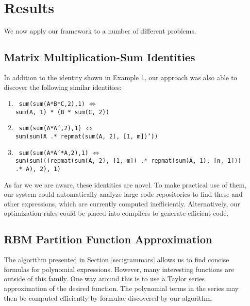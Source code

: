 
\vspace{-2mm}
\section{Results}
\vspace{-2mm}

We now apply our framework to a number of different problems.

\vspace{-2mm}
\subsection{Matrix Multiplication-Sum Identities}
In addition to the identity shown in Example 1, our approach was also
able to discover the following similar identities:
\begin{enumerate}
\item \texttt{ sum(sum(A*B*C,2),1)} $\iff$ \\ \texttt{sum(A, 1) * (B * sum(C, 2))}
\item \texttt{ sum(sum(A*A',2),1)} $\iff$ \\ \hspace{-5mm}  \texttt{sum(sum(A .* repmat(sum(A, 2), [1, m])'))}
\item \texttt{ sum(sum(A*A'*A,2),1)} $\iff$ \\ \texttt{sum(sum(((repmat(sum(A, 2), [1, m]) .* repmat(sum(A, 1), [n, 1])) .* A), 2), 1) 
} 
\end{enumerate}

As far we we are aware, these identities are novel. To make practical
use of them, our
system could automatically analyze large code repositories to find
these and other expressions, which are currently computed
inefficiently. Alternatively, our optimization rules could be placed
into compilers to generate efficient code.

\subsection{RBM Partition Function Approximation}
\label{partitionfunction}

The algorithm presented in Section
\ref{sec:grammars} allows us to find concise formulas for polynomial expressions.
However, many interesting functions are outside of this
family. One way around this is to use a Taylor series approximation of
the desired function. The polynomial terms in the series may then be
computed efficiently by formulae discovered by our algorithm.

